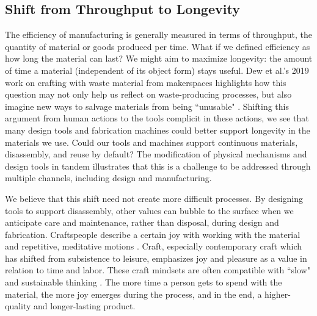 \documentclass{sigchi}
\begin{document}

\subsection{Shift from Throughput to Longevity}

The efficiency of manufacturing is generally measured in terms of throughput, the quantity of material or goods produced per time. What if we defined efficiency as how long the material can last? We might aim to maximize longevity: the amount of time a material (independent of its object form) stays useful. Dew et al.'s 2019 work on crafting with waste material from makerspaces highlights how this question may not only help us reflect on waste-producing processes, but also imagine new ways to salvage materials from being ``unusable" \cite{Dew:2019:DWS:3322276.3322320}. Shifting this argument from human actions to the tools complicit in these actions, we see that many design tools and fabrication machines could better support longevity in the materials we use. Could our tools and machines support continuous materials, disassembly, and reuse by default? The modification of physical mechanisms and design tools in tandem illustrates that this is a challenge to be addressed through multiple channels, including design and manufacturing. 

We believe that this shift need not create more difficult processes. By designing tools to support disassembly, other values can bubble to the surface when we anticipate care and maintenance, rather than disposal, during design and fabrication. Craftspeople describe a certain joy with working with the material and repetitive, meditative motions \cite{pye_nature_2007, fletcher_craft_2016, nitsche_when_2019}. Craft, especially contemporary craft which has shifted from subsistence to leisure, emphasizes joy and pleasure as a value in relation to time and labor. These craft mindsets are often compatible with ``slow" and sustainable thinking \cite{pan_fashion_2014, phelan_what_2017}. The more time a person gets to spend with the material, the more joy emerges during the process, and in the end, a higher-quality and longer-lasting product.
\end{document}
